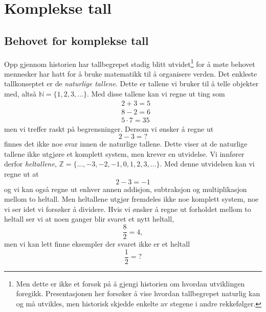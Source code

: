 \documentclass[a4paper,norsk,12pt]{article}
\begin{document}
\section{Komplekse tall}

\subsection{Behovet for komplekse tall}
Opp gjennom historien har tallbegrepet stadig blitt utvidet\footnote{Men dette er ikke et forsøk på å gjengi historien om hvordan utviklingen foregikk. Presentasjonen her forsøker å vise hvordan tallbegrepet naturlig kan og må utvikles, men historisk skjedde enkelte av stegene i andre rekkefølger.} for å møte behovet mennesker har hatt for å bruke matematikk til å organisere verden. Det enkleste tallkonseptet er de \emph{naturlige tallene}. Dette er tallene vi bruker til å telle objekter med, altså $\mathbb{N} = \{1, 2, 3, \ldots\}$. Med disse tallene kan vi regne ut ting som
\begin{align*}
	&2 + 3 = 5 \\
	&8 - 2 = 6 \\
	&5\cdot 7 = 35
\end{align*}
men vi treffer raskt på begrensninger. Dersom vi ønsker å regne ut
\begin{displaymath}
	2-3 = ?
\end{displaymath}
finnes det ikke noe svar innen de naturlige tallene. Dette viser at de naturlige tallene ikke utgjøre et komplett system, men krever en utvidelse. Vi innfører derfor \emph{heltallene}, $\mathbb{Z} = \{\ldots, -3, -2, -1, 0, 1, 2, 3, \ldots\}$. Med denne utvidelsen kan vi regne ut at
\begin{displaymath}
	2-3 = -1
\end{displaymath}
og vi kan også regne ut enhver annen addisjon, subtraksjon og multiplikasjon mellom to heltall. Men heltallene utgjør fremdeles ikke noe komplett system, noe vi ser idet vi forsøker å dividere. Hvis vi ønsker å regne ut forholdet mellom to heltall ser vi at noen ganger blir svaret et nytt heltall,
\begin{displaymath}
	\frac{8}{2} = 4,
\end{displaymath}
men vi kan lett finne eksempler der svaret ikke er et heltall
\begin{displaymath}
	\frac{1}{2} = ?
\end{displaymath}
\end{document}
